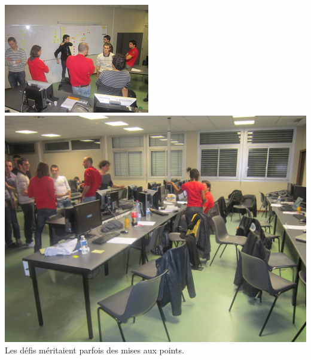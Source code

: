 \documentclass[a4paper,francais,titlepage]{article}
\begin{document}
    \includegraphics[scale=1.6]{brainstorming.jpeg} \hspace{0.3cm} \includegraphics[scale=0.38]{brainstorming3.jpeg} \\
    Les défis méritaient parfois des mises aux points. \\
    
\end{document}

